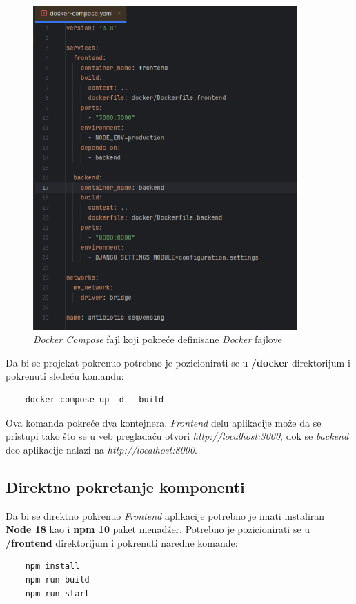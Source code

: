 \documentclass[12pt,oneside]{memoir}
\begin{document}
\begin{figure}[h]
\centering
\includegraphics[width=0.9\textwidth]{images/docker_compose.png}
\caption{\emph{Docker Compose} fajl koji pokreće definisane \emph{Docker} fajlove}
\label{fig:docker_compose}
\end{figure}

Da bi se projekat pokrenuo potrebno je pozicionirati se u \textbf{/docker} direktorijum i pokrenuti sledeću komandu:
\begin{verbatim}
    docker-compose up -d --build
\end{verbatim}

Ova komanda pokreće dva kontejnera. \emph{Frontend} delu aplikacije može da se pristupi tako što se u veb pregladaču otvori \emph{http://localhost:3000}, dok se \emph{backend} deo aplikacije nalazi na \emph{http://localhost:8000}.

\subsection{Direktno pokretanje komponenti}

Da bi se direktno pokrenuo \emph{Frontend} aplikacije potrebno je imati instaliran \textbf{Node 18} kao i \textbf{npm 10} paket menadžer. Potrebno je pozicionirati se u \textbf{/frontend} direktorijum i pokrenuti naredne komande:
\begin{verbatim}
    npm install
    npm run build
    npm run start
\end{verbatim}
\end{document}
